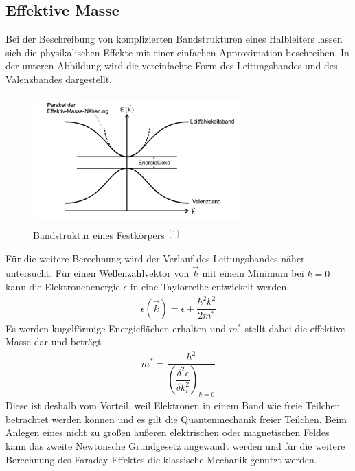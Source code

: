 \documentclass{article}
\begin{document}
\subsection{Effektive Masse}
Bei der Beschreibung von komplizierten Bandstrukturen eines Halbleiters lassen sich die physikalischen Effekte mit einer einfachen Approximation beschreiben.  In der unteren Abbildung wird die vereinfachte Form des Leitungsbandes und des Valenzbandes dargestellt.
\begin{figure}[H]
	\centering
	\includegraphics[height=5cm, width=8cm]{bandstruktur.png}
	\caption{Bandstruktur eines Festkörpers $^{[1]}$}   
	\label{fig: abb. 1}
\end{figure}
 Für die weitere Berechnung wird der Verlauf des Leitungsbandes näher untersucht. Für einen Wellenzahlvektor von $\vec{k}$ mit einem Minimum bei $k=0$ kann die Elektronenenergie $\epsilon$ in eine Taylorreihe entwickelt werden.
\begin{align}
\epsilon(\vec{k})=\epsilon+ \dfrac{\hbar^2k^2}{2m^{\ast}}
\end{align}
Es werden kugelförmige Energieflächen erhalten und $m^{\ast}$ stellt dabei die effektive Masse dar und beträgt
\begin{align}
m^{\ast}=\dfrac{h^2}{\left(\dfrac{\delta^2\epsilon}{\delta k_i^2}\right)_{k=0}}
\end{align}
 Diese ist deshalb vom Vorteil, weil Elektronen in einem Band wie freie Teilchen betrachtet werden können und es gilt die Quantenmechanik freier Teilchen. Beim Anlegen eines nicht zu großen äußeren elektrischen oder magnetischen Feldes kann das zweite Newtonsche Grundgesetz angewandt werden und für die weitere Berechnung des Faraday-Effektes die klassische Mechanik genutzt werden. 
\end{document}
